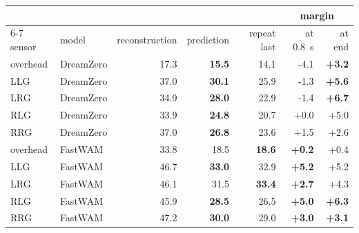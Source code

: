 \begin{tabular}{llrrrrr}
\toprule
& & & & & \multicolumn{2}{c}{margin} \\
\cmidrule(lr){6-7}
sensor & model & reconstruction & prediction & repeat last & at \SI{0.8}{\second} & at end \\
\midrule
overhead & DreamZero & 17.3 & \textbf{15.5} & 14.1 & -4.1 & \textbf{+3.2} \\
LLG & DreamZero & 37.0 & \textbf{30.1} & 25.9 & -1.3 & \textbf{+5.6} \\
LRG & DreamZero & 34.9 & \textbf{28.0} & 22.9 & -1.4 & \textbf{+6.7} \\
RLG & DreamZero & 33.9 & \textbf{24.8} & 20.7 & +0.0 & +5.0 \\
RRG & DreamZero & 37.0 & \textbf{26.8} & 23.6 & +1.5 & +2.6 \\
overhead & FastWAM & 33.8 & 18.5 & \textbf{18.6} & \textbf{+0.2} & +0.4 \\
LLG & FastWAM & 46.7 & \textbf{33.0} & 32.9 & \textbf{+5.2} & +5.2 \\
LRG & FastWAM & 46.1 & 31.5 & \textbf{33.4} & \textbf{+2.7} & +4.3 \\
RLG & FastWAM & 45.9 & \textbf{28.5} & 26.5 & \textbf{+5.0} & \textbf{+6.3} \\
RRG & FastWAM & 47.2 & \textbf{30.0} & 29.0 & \textbf{+3.0} & \textbf{+3.1} \\
\bottomrule
\end{tabular}
